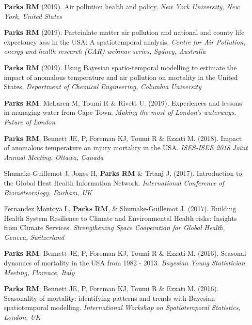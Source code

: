 \noindent \textbf{Parks RM} (2019). Air pollution health and policy,  \textit{New York University, New York, United States} \bigskip

\noindent \textbf{Parks RM} (2019). Partciulate matter air pollution and national and county life expectancy loss in the USA: A spatiotemporal analysis,  \textit{Centre for Air Pollution, energy and health research (CAR) webinar series, Sydney, Australia} \bigskip

\noindent \textbf{Parks RM} (2019). Using Bayesian spatio-temporal modelling to estimate the impact of anomalous temperature and air pollution on mortality in the United States,  \textit{Department of Chemical Engineering, Columbia University} \bigskip

\noindent \textbf{Parks RM}, McLaren M, Toumi R \& Rivett U. (2019). Experiences and lessons in managing water from Cape Town. \textit{Making the most of London's waterways, Future of London} \bigskip

\noindent \textbf{Parks RM}, Bennett JE, P, Foreman KJ, Toumi R \& Ezzati M. (2018). Impact of anomalous temperature on injury mortality in the USA.  \textit{ISES-ISEE 2018 Joint Annual Meeting, Ottawa, Canada} \bigskip

\noindent Shumake-Guillemot J, Jones H, \textbf{Parks RM} \& Trtanj J. (2017). Introduction to the Global Heat Health Information Network.  \textit{International Conference of Biometeorology, Durham, UK} \bigskip

\noindent Fernandez Montoya L, \textbf{Parks RM}, \& Shumake-Guillemot J. (2017). Building Health System Resilience to Climate and Environmental Health risks: Insights from Climate Services.  \textit{Strengthening Space Cooperation for Global Health, Geneva, Switzerland} \bigskip

\noindent \textbf{Parks RM}, Bennett JE, P, Foreman KJ, Toumi R \& Ezzati M. (2016). Seasonal dynamics of mortality in the USA from 1982 - 2013. \textit{Bayesian Young Statistician Meeting, Florence, Italy} \bigskip

\noindent \textbf{Parks RM}, Bennett JE, P, Foreman KJ, Toumi R \& Ezzati M. (2016). Seasonality of mortality: identifying patterns and trends with Bayesian spatiotemporal modelling. \textit{International Workshop on Spatiotemporal Statistics, London, UK}

